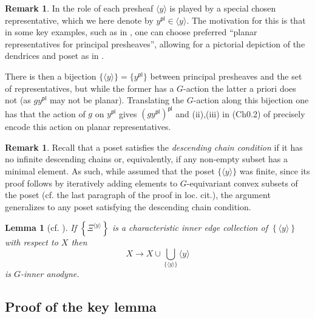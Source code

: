 \documentclass[a4paper,10pt
,draft
]{article}%
\numberwithin{equation}{section}
\numberwithin{figure}{section}
\newtheorem{lemma}[equation]{Lemma}%
\theoremstyle{definition} %
\newtheorem{remark}[equation]{Remark}%
\newcommand{\1}{\ensuremath{\mathbbm 1}}%
\begin{document}
\begin{remark}\label{CH02 REM}
	In \cite[Rem. 3.7]{BP_edss} the role of each presheaf 
	$\langle y \rangle$ is played by a special chosen representative,
	which we here denote by
	$y^{\mathsf{pl}} \in \langle y \rangle$. 
	The motivation for this is that in some key examples, such as in \cite[Ex. 3.9]{BP_edss}, one can choose preferred ``planar representatives for principal presheaves'',
	allowing for a pictorial depiction of the dendrices and poset as in
	\cite[Fig. 3.1]{BP_edss}. 
	
	There is then a bijection $\{\langle y \rangle\} = \{ y^{\mathsf{pl}}\}$ between principal presheaves and the set of representatives, but while the former has a $G$-action the latter a priori does not (as $gy^{\mathsf{pl}}$ may not be planar). Translating the $G$-action along this bijection one has that the action of $g$ on $y^{\mathsf{pl}}$ gives
	$(g y^{\mathsf{pl}})^{\mathsf{pl}}$ and (ii),(iii) in 
	(Ch0.2) of \cite[Rem. 3.7]{BP_edss} precisely 
	encode this action on planar representatives.
\end{remark}

\begin{remark}\label{DCC REM}
	Recall that a poset satisfies the 
	\emph{descending chain condition}
	if it has no infinite descending chains or, equivalently, if any non-empty subset has a minimal element. As such, while  \cite[Lemma 3.4]{BP_edss}
	assumed that the poset $\{\langle y \rangle\}$ was finite,
	since its proof follows by iteratively adding elements to $G$-equivariant convex subsets of the poset (cf. the last paragraph of the proof in loc. cit.), 
	the argument generalizes to any poset satisfying the descending chain condition.
\end{remark}

\begin{lemma}[{cf. \cite[Lemma 3.4]{BP_edss}}]
	\label{CHAREDGE LEM}
	If
	$
	\left\{ \Xi^{\langle y \rangle} \right \} 
	$
	is a \emph{characteristic inner edge collection 
	of $\left\{ \langle y \rangle \right\}$ with respect to $X$} then
	\begin{equation}\label{CHAREDGE EQ}
	X \to X \cup \bigcup_{\{\langle y \rangle\}} \langle y \rangle
	\end{equation}
	is $G$-inner anodyne.
\end{lemma}




\subsection{Proof of the key lemma}
\end{document}
